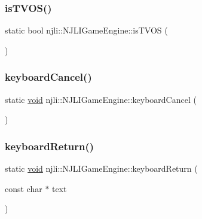 \subsubsection{\texorpdfstring{is\+T\+V\+O\+S()}{isTVOS()}}
{\footnotesize\ttfamily static bool njli\+::\+N\+J\+L\+I\+Game\+Engine\+::is\+T\+V\+OS (\begin{DoxyParamCaption}{ }\end{DoxyParamCaption})\hspace{0.3cm}{\ttfamily [static]}}

\mbox{\label{classnjli_1_1_n_j_l_i_game_engine_a885ab8ad0939bf6fa51009b5854ef2be}} 
\subsubsection{\texorpdfstring{keyboard\+Cancel()}{keyboardCancel()}}
{\footnotesize\ttfamily static \mbox{\hyperlink{_thread_8h_af1e856da2e658414cb2456cb6f7ebc66}{void}} njli\+::\+N\+J\+L\+I\+Game\+Engine\+::keyboard\+Cancel (\begin{DoxyParamCaption}{ }\end{DoxyParamCaption})\hspace{0.3cm}{\ttfamily [static]}}

\mbox{\label{classnjli_1_1_n_j_l_i_game_engine_a360672d3cfecffb69a91462256da9da4}} 
\subsubsection{\texorpdfstring{keyboard\+Return()}{keyboardReturn()}}
{\footnotesize\ttfamily static \mbox{\hyperlink{_thread_8h_af1e856da2e658414cb2456cb6f7ebc66}{void}} njli\+::\+N\+J\+L\+I\+Game\+Engine\+::keyboard\+Return (\begin{DoxyParamCaption}\item[{const char $\ast$}]{text }\end{DoxyParamCaption})\hspace{0.3cm}{\ttfamily [static]}}

